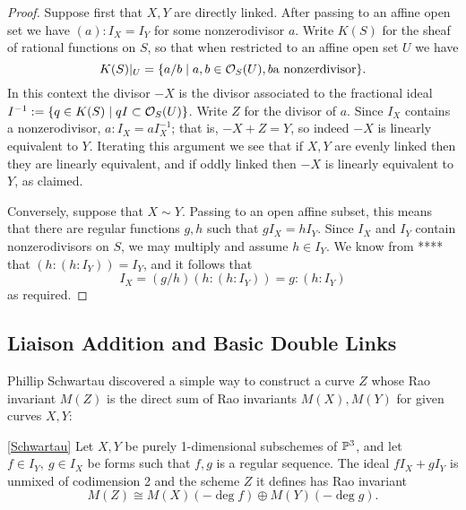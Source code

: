 \begin{proof} Suppose first that $X,Y$ are directly linked. After passing to an affine open set we have
$(a):I_X = I_Y$ for some nonzerodivisor $a$. Write $K(S)$ for the sheaf of rational functions on $S$, so that
when restricted to an affine open set $U$ we have 
$$
K(S)|_U = \{a/b\mid a,b \in \sO_S(U), b \hbox{a nonzerdivisor}\}.
$$  
In this context the divisor $-X$ is the divisor associated to the
fractional ideal $I^{-1} := \{q\in K(S) \mid qI \subset \sO_S(U)\}$.
Write $Z$ for the divisor of $a$. Since $I_X$ contains a nonzerodivisor, $a:I_X = aI_X^{-1}$; that is,
$-X+Z = Y$, so indeed $-X$ is linearly equivalent to $Y$. Iterating this argument we see that if $X,Y$ are evenly linked then
they are linearly equivalent, and if oddly linked then $-X$ is linearly equivalent to $Y$, as claimed.

Conversely, suppose that $X \sim Y$. Passing to an open affine subset, this means that there are regular functions $g,h$
such that $gI_X = hI_Y$. Since $I_X$ and $I_Y$ contain nonzerodivisors on $S$, we may multiply and assume $h\in I_Y$.
We know from **** that $(h:(h:I_Y)) = I_Y$, and it follows that 
$$
I_X = (g/h)(h:(h:I_Y))= g:(h:I_Y)
$$
as required.
\end{proof}

\subsection{Liaison Addition and Basic Double Links}

Phillip Schwartau discovered a simple way to construct a curve $Z$ whose Rao invariant $M(Z)$ is the direct sum of Rao 
invariants $M(X), M(Y)$ for given curves $X,Y$:

\begin{proposition}\ref{Schwartau}\label{Schwartau}
 Let $X,Y$ be purely 1-dimensional subschemes of $\PP^3$, and let $f\in I_Y,\ g\in I_X$ be forms such that $f,g$ is a regular
 sequence. The ideal $fI_X+gI_Y$ is unmixed of codimension 2 and the scheme $Z$ it defines has Rao invariant
 $$
 M(Z) \cong M(X)(-\deg f)\oplus M(Y)(-\deg g).
 $$
\end{proposition}

